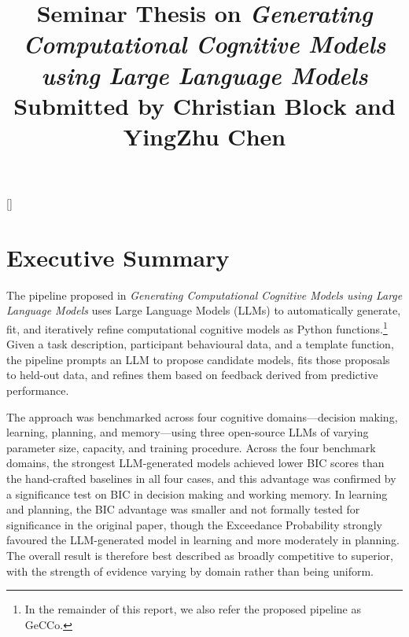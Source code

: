 \titleformat{\section}{\large\bfseries}{}{0em}{}[\titlerule]
\titleformat{\subsection}{\normalsize\bfseries}{}{0em}{}

\title{\textbf{Seminar Thesis on \textit{Generating Computational Cognitive Models
using Large Language Models}}\\
\large Submitted by Christian Block and YingZhu Chen}

\author{}
\date{}



\maketitle
\tableofcontents

\section{Executive Summary}

The pipeline proposed in \textit{Generating Computational Cognitive Models
using Large Language Models} uses Large Language Models (LLMs) to automatically generate, fit, and iteratively refine computational cognitive models as Python functions.\footnote{In the remainder of this report, we also refer the proposed pipeline as GeCCo.} Given a task description, participant behavioural data, and a template function, the pipeline prompts an LLM to propose candidate models, fits those proposals to held-out data, and refines them based on feedback derived from predictive performance.

The approach was benchmarked across four cognitive domains---decision making, learning, planning, and memory---using three open-source LLMs of varying parameter size, capacity, and training procedure. Across the four benchmark domains, the strongest LLM-generated models achieved lower BIC scores than the hand-crafted baselines in all four cases, and this advantage was confirmed by a significance test on BIC in decision making and working memory. In learning and planning, the BIC advantage was smaller and not formally tested for significance in the original paper, though the Exceedance Probability strongly favoured the LLM-generated model in learning and more moderately in planning. The overall result is therefore best described as broadly competitive to superior, with the strength of evidence varying by domain rather than being uniform.


